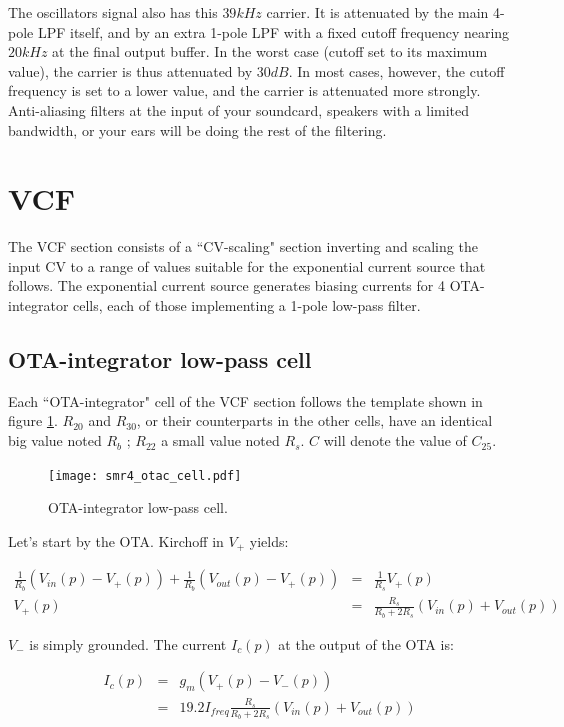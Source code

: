 \documentclass[a4paper,11pt]{article}
\begin{document}
The oscillators signal also has this $39kHz$ carrier. It is attenuated by the main 4-pole LPF itself, and by an extra 1-pole LPF with a fixed cutoff frequency nearing $20kHz$ at the final output buffer. In the worst case (cutoff set to its maximum value), the carrier is thus attenuated by $30dB$. In most cases, however, the cutoff frequency is set to a lower value, and the carrier is attenuated more strongly. Anti-aliasing filters at the input of your soundcard, speakers with a limited bandwidth, or your ears will be doing the rest of the filtering.

\section{VCF}
\label{sec:vcf}

The VCF section consists of a ``CV-scaling" section inverting and scaling the input CV to a range of values suitable for the exponential current source that follows. The exponential current source generates biasing currents for 4 OTA-integrator cells, each of those implementing a 1-pole low-pass filter.

\subsection{OTA-integrator low-pass cell}
\label{sec:otac}

Each ``OTA-integrator" cell of the VCF section follows the template shown in figure \ref{fig:otac}. $R_{20}$ and $R_{30}$, or their counterparts in the other cells, have an identical big value noted $R_b$ ; $R_{22}$ a small value noted $R_s$. $C$ will denote the value of $C_{25}$.

\begin{figure}
\centering
\texttt{[image: smr4\_otac\_cell.pdf]}
\caption{OTA-integrator low-pass cell.}
\label{fig:otac}
\end{figure}

Let's start by the OTA. Kirchoff in $V_+$ yields:

\begin{eqnarray}
\frac{1}{R_b}(V_{in}(p) - V_+(p)) + \frac{1}{R_b} (V_{out}(p) - V_+(p)) &=& \frac{1}{R_s} V_+(p) \\
V_+(p) &=& \frac{R_s}{R_b + 2 R_s} (V_{in}(p) + V_{out}(p))
\end{eqnarray}

$V_-$ is simply grounded. The current $I_c(p)$ at the output of the OTA is:

\begin{eqnarray}
I_c(p) &=& g_m (V_+(p) - V_-(p)) \\
 &=& 19.2 I_{freq} \frac{R_s}{R_b + 2 R_s} (V_{in}(p) + V_{out}(p))
\end{eqnarray}
\end{document}
